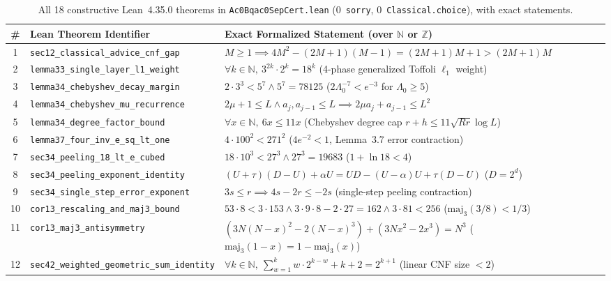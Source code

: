 \documentclass[10pt,twocolumn]{article}
\begin{document}
\begin{table}[t]
\centering
\scriptsize
\setlength{\tabcolsep}{2.8pt}
\caption{All 18 constructive Lean~4.35.0 theorems in \texttt{Ac0Bqac0SepCert.lean} (0~\texttt{sorry}, 0~\texttt{Classical.choice}), with exact statements.}
\label{tab:lean}
\begin{tabular}{@{}cll@{}}
\toprule
\# & Lean Theorem Identifier & Exact Formalized Statement (over $\mathbb{N}$ or $\mathbb{Z}$) \\
\midrule
1 & \texttt{sec12\_classical\_advice\_cnf\_gap} & $M\ge 1 \implies 4M^2 - (2M+1)(M-1) = (2M+1)M + 1 > (2M+1)M$ \\
2 & \texttt{lemma33\_single\_layer\_l1\_weight} & $\forall k\in\mathbb{N},\ 3^{2k}\cdot 2^k = 18^k$ (4-phase generalized Toffoli $\ell_1$ weight) \\
3 & \texttt{lemma34\_chebyshev\_decay\_margin} & $2\cdot 3^3 < 5^7 \wedge 5^7 = 78125$ ($2\Lambda_0^{-7} < e^{-3}$ for $\Lambda_0 \ge 5$) \\
4 & \texttt{lemma34\_chebyshev\_mu\_recurrence} & $2\mu+1\le L \wedge a_j, a_{j-1}\le L \implies 2\mu a_j + a_{j-1} \le L^2$ \\
5 & \texttt{lemma34\_degree\_factor\_bound} & $\forall x\in\mathbb{N},\ 6x \le 11x$ (Chebyshev degree cap $r+h \le 11\sqrt{Rr}\log L$) \\
6 & \texttt{lemma37\_four\_inv\_e\_sq\_lt\_one} & $4\cdot 100^2 < 271^2$ ($4e^{-2} < 1$, Lemma~3.7 error contraction) \\
7 & \texttt{sec34\_peeling\_18\_lt\_e\_cubed} & $18\cdot 10^3 < 27^3 \wedge 27^3 = 19683$ ($1 + \ln 18 < 4$) \\
8 & \texttt{sec34\_peeling\_exponent\_identity} & $(U+\tau)(D-U) + \alpha U = UD - (U-\alpha)U + \tau(D-U)$ ($D=2^d$) \\
9 & \texttt{sec34\_single\_step\_error\_exponent} & $3s \le r \implies 4s - 2r \le -2s$ (single-step peeling contraction) \\
10 & \texttt{cor13\_rescaling\_and\_maj3\_bound} & $53\cdot 8 < 3\cdot 153 \wedge 3\cdot 9\cdot 8 - 2\cdot 27 = 162 \wedge 3\cdot 81 < 256$ ($\mathrm{maj}_3(3/8) < 1/3$) \\
11 & \texttt{cor13\_maj3\_antisymmetry} & $(3N(N-x)^2 - 2(N-x)^3) + (3Nx^2 - 2x^3) = N^3$ ($\mathrm{maj}_3(1-x) = 1-\mathrm{maj}_3(x)$) \\
12 & \texttt{sec42\_weighted\_geometric\_sum\_identity} & $\forall k\in\mathbb{N},\ \sum_{w=1}^k w\cdot 2^{k-w} + k + 2 = 2^{k+1}$ (linear CNF size $< 2$) \\

\end{tabular}
\end{table}
\end{document}
